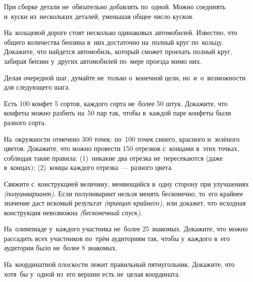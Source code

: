 При сборке детали не~обязательно добавлять по~одной.
Можно соединять и~куски из~нескольких деталей, уменьшая общее число кусков.

\begin{exercises}

\item
На~кольцевой дороге стоят несколько одинаковых автомобилей.
Известно, что общего количества бензина в~них достаточно на~полный круг
по~кольцу.
Докажите, что найдется автомобиль, который сможет проехать полный круг, забирая
бензин у~других автомобилей по~мере проезда мимо них.

\end{exercises}

Делая очередной шаг, думайте не~только о~конечной цели, но~и~о~возможности для
следующего шага.

\begin{exercises}

\item
Есть 100 конфет 5 сортов, каждого сорта не~более 50 штук.
Докажите, что конфеты можно разбить на~50 пар так, чтобы в~каждой паре конфеты
были разного сорта.

\item
На~окружности отмечено 300 точек: по~100 точек синего, красного и~зелёного
цветов.
Докажите, что можно провести 150 отрезков с~концами в~этих точках, соблюдая
такие правила:
(1)~никакие два отрезка не~пересекаются (даже в~концах);
(2)~концы каждого отрезка~--- разного цвета.

\end{exercises}

Свяжите с~конструкцией величину, меняющийся в~одну сторону при улучшениях
\emph{(полуинвариант).}
Если полуинваринт нельзя менять бесконечно, то~его крайнее значение даст
искомый результат \emph{(принцип крайнего),} или докажет, что исходная
конструкция невозможна \emph{(бесконечный спуск).}

\begin{exercises}

\item
На~олимпиаде у~каждого участника не~более 25 знакомых.
Докажите, что можно рассадить всех участников по~трём аудиториям так, чтобы
у~каждого в~его аудитории было не~более 8 знакомых.

\itemx{*}
На~координатной плоскости лежит правильный пятиугольник.
Докажите, что хотя~бы у~одной из~его вершин есть не~целая координата.

\end{exercises}


